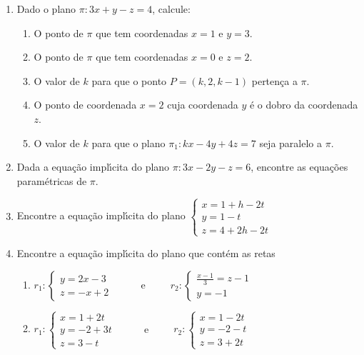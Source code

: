 \documentclass[a4paper,5pt]{amsbook}
\begin{document}
\begin{enumerate}
	\vspace{0.5cm}
	\item Dado o plano $\pi: 3x + y -z = 4$, calcule:
	\begin{enumerate}
		\item O ponto de $\pi$ que tem coordenadas $x=1$ e $y=3$.
		\item O ponto de $\pi$ que tem coordenadas $x=0$ e $z=2$.
		\item O valor de $k$ para que o ponto $P = (k, 2, k-1)$ perten\c{c}a a
			$\pi$.
		\item O ponto de coordenada $x=2$ cuja coordenada $y$ \'e o dobro da
			coordenada $z$.
		\item O valor de $k$ para que o plano $\pi_1:kx-4y+4z = 7$ seja
			paralelo a $\pi$.
	\end{enumerate}

	\vspace{0.5cm}
	\item Dada a equa\c{c}\~ao impl\'{\i}cita do plano $\pi: 3x - 2y - z = 6$, encontre as
		equa\c{c}\~oes param\'etricas de $\pi$.

	\vspace{0.5cm}
	\item Encontre a equa\c{c}\~ao impl\'{\i}cita do plano 
	$\left\{\begin{array}{l}
		x = 1 + h - 2t \\
		y = 1 - t \\
		z = 4 + 2h - 2t
	\end{array}\right.$
	
	\vspace{0.5cm}
	\item Encontre a equa\c{c}\~ao impl\'{\i}cita do plano que cont\'em as retas
	\begin{enumerate}
		\vspace{0.3cm}
		\item
			$r_1:\left\{\begin{array}{l}
				y = 2x - 3 \\
				z = -x + 2
			\end{array}\right.$
		\ \ \ \ \ e\ \ \ \ \ 
			$r_2:\left\{\begin{array}{l}
				\frac{x-1}{3} = z-1 \\
				y = -1
			\end{array}\right.$
		\vspace{0.3cm}
		\item
			$r_1:\left\{\begin{array}{l}
				x = 1 + 2t \\
				y = -2 + 3t \\
				z = 3 -t
			\end{array}\right.$
		\ \ \ \ \ e\ \ \ \ \ 
			$r_2:\left\{\begin{array}{l}
				x = 1 - 2t \\
				y = -2 - t \\
				z = 3 + 2t
			\end{array}\right.$
	\end{enumerate}
	

\end{enumerate}
\end{document}
